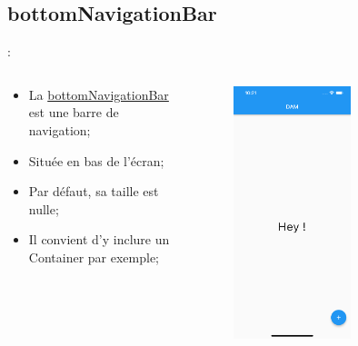\documentclass[10pt]{beamer}
\begin{document}
\subsection{bottomNavigationBar}
\begin{frame}[fragile]{\secname : \subsecname}
    \begin{columns}
        \begin{column}{0.6\textwidth}
            \begin{itemize}
                \item La \href{https://api.flutter.dev/flutter/material/BottomNavigationBar-class.html}{bottomNavigationBar} est une barre de navigation;
                \item Située en bas de l’écran;
                \item Par défaut, sa taille est nulle;
                \item Il convient d’y inclure un Container par exemple;
            \end{itemize}
        \end{column}
        \begin{column}{0.4\textwidth}
            \begin{figure}
                \begin{center}
                    \includegraphics[width=0.60\textwidth]{../assets/img/floatingActionButton.jpg}
                \end{center}
            \end{figure}\end{column}
    \end{columns}
\end{frame}
\end{document}
